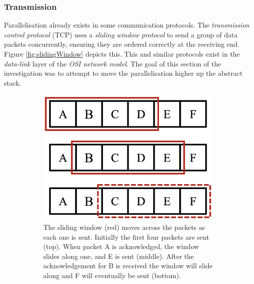 \setlength{\leftskip}{0cm}
\subsubsection{Transmission}
\setlength{\leftskip}{0.5cm}
\indent \indent
Parallelisation already exists in some communication protocols. The \textit{transmission control protocol} (TCP) uses a \textit{sliding window protocol} to send a group of data packets concurrently, ensuring they are ordered correctly at the receiving end. Figure \ref{fig:slidingWindow} depicts this. This and similar protocols exist in the \textit{data-link} layer of the \textit{OSI network model}. The goal of this section of the investigation was to attempt to move the parallelisation higher up the abstract stack.
\begin{figure}[htp]
    \begin{subfigure}[b]{0.45\textwidth}
        \centering
        \includegraphics[scale=0.3]{figures/slidingWindow1}
        \caption{The sliding window (red) moves across the packets as each one is sent. Initially the first four packets are sent (top). When packet A is acknowledged, the window slides along one, and E is sent (middle). After the acknowledgement for B is received the window will slide along and F will eventually be sent (bottom).}
    \end{subfigure}\hfill%
    \begin{subfigure}[b]{0.45\textwidth}
        \centering

\end{subfigure}
\end{figure}

